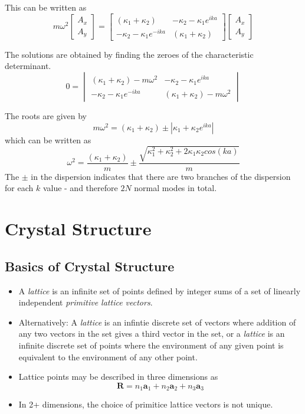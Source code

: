 \documentclass[10pt]{article}
\begin{document}
This can be written as
$$
m\omega^{2} \begin{bmatrix}
A_{x}\\ A_{y}
\end{bmatrix} =
\begin{bmatrix}
 (\kappa_{1} + \kappa_{2})& -\kappa_{2} - \kappa_{1}e^{ika}\\
-\kappa_{2}-\kappa_{1}e^{-ika} & (\kappa_{1} + \kappa_{2})
\end{bmatrix}
\begin{bmatrix}
A_{x}\\ A_{y}
\end{bmatrix}
$$

The solutions are obtained by finding the zeroes of the characteristic determinant.
$$
0 = \begin{vmatrix}
 (\kappa_{1} + \kappa_{2}) - m\omega^{2}& -\kappa_{2} - \kappa_{1}e^{ika}\\
-\kappa_{2}-\kappa_{1}e^{-ika} & (\kappa_{1} + \kappa_{2})-m\omega^{2}
\end{vmatrix}
$$

The roots are given by
$$
m\omega^{2} = (\kappa_{1} + \kappa_{2}) \pm \left | \kappa_{1} + \kappa_{2}e^{ika}\right |
$$
which can be written as
$$
\omega^{2} = \frac{(\kappa_{1} + \kappa_{2})}{m} \pm \frac{\sqrt{\kappa_{1}^{2} + \kappa_{2}^{2} + 2\kappa_{1}\kappa_{2}cos(ka)}}{m}
$$
The $\pm$ in the dispersion indicates that there are two branches of the dispersion for each $k$ value - and therefore $2N$ normal modes
in total. 

\section{Crystal Structure}
\subsection{Basics of Crystal Structure}
\begin{itemize}
\item A \emph{lattice} is an infinite set of points defined by integer sums of a set of linearly
independent \emph{primitive lattice vectors}.
\item Alternatively: A \emph{lattice} is an infintie discrete set of vectors where addition of
any two vectors in the set gives a third vector in the set, or a \emph{lattice} is an infinite
discrete set of points where the environment of any given point is equivalent to the environment
of any other point.
\item Lattice points may be described in three dimensions as
$$\textbf{R} = n_{1}\textbf{a}_{1} + n_{2}\textbf{a}_2 + n_{3}\textbf{a}_{3}$$
\item In 2+ dimensions, the choice of primitice lattice vectors is not unique.
\end{itemize}
\end{document}
